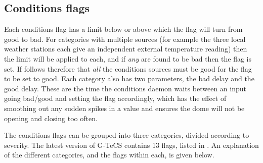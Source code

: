 \subsection{Conditions flags}
\label{sec:conditions_flags}
\begin{colsection}

Each conditions flag has a limit below or above which the flag will turn from good to bad. For categories with multiple sources (for example the three local weather stations each give an independent external temperature reading) then the limit will be applied to each, and if \textit{any} are found to be bad then the flag is set. If follows therefore that \textit{all} the conditions sources must be good for the flag to be set to good. Each category also has two parameters, the bad delay and the good delay. These are the time the conditions daemon waits between an input going bad/good and setting the flag accordingly, which has the effect of smoothing out any sudden spikes in a value and ensures the dome will not be opening and closing too often.

The conditions flags can be grouped into three categories, divided according to severity. The latest version of G-TeCS contains 13 flags, listed in . An explanation of the different categories, and the flags within each, is given below.


\end{colsection}
